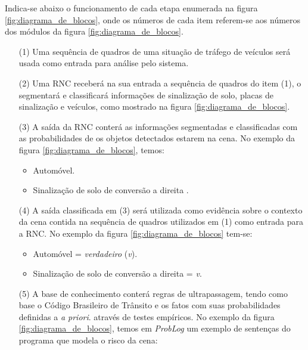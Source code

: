 \documentclass[
	12pt,				%
    oneside,			%
	a4paper,			%
	english,			%
	french,				%
	spanish,			%
	brazil,				%
	]{abntex2}
\begin{document}
Indica-se abaixo o funcionamento de cada etapa enumerada na figura \ref{fig:diagrama_de_blocos}, onde os números de cada item referem-se aos números dos módulos da figura \ref{fig:diagrama_de_blocos}.

\begin{enumerate}
    

    \item[{(1)}] Uma sequência de quadros de uma situação de tráfego de veículos será usada como entrada para análise pelo sistema.


    \item[{(2)}] Uma RNC receberá na sua entrada a sequência de quadros do item (1), o segmentará e classificará informações de sinalização de solo, placas de sinalização e veículos, como mostrado na figura \ref{fig:diagrama_de_blocos}.


    \item[{(3)}] A saída da RNC conterá as informações segmentadas e classificadas com as probabilidades de os objetos detectados estarem na cena. No exemplo da figura \ref{fig:diagrama_de_blocos}, temos:
        \begin{itemize}
            \item Automóvel.
            \item Sinalização de solo de conversão a direita . 
        \end{itemize}
        
    \item[{(4)}] A saída classificada em (3) será utilizada como evidência sobre o contexto da cena contida na sequência de quadros utilizados em (1) como entrada para a RNC. No exemplo da figura \ref{fig:diagrama_de_blocos} tem-se:
        \begin{itemize}
            \item Automóvel = \textit{verdadeiro} (\textit{v}).
            \item Sinalização de solo de conversão a direita  = \textit{v}.
        \end{itemize}    
        

    \item[{(5)}] A base de conhecimento conterá regras de ultrapassagem, tendo como base o Código Brasileiro de Trânsito e os fatos com suas probabilidades definidas a  \textit{a priori}. através de testes empíricos. No exemplo da figura \ref{fig:diagrama_de_blocos}, temos em \textit{ProbLog} um exemplo de sentenças do programa que modela o risco da cena:
        \begin{itemize}
        

\end{itemize}
\end{enumerate}
\end{document}
